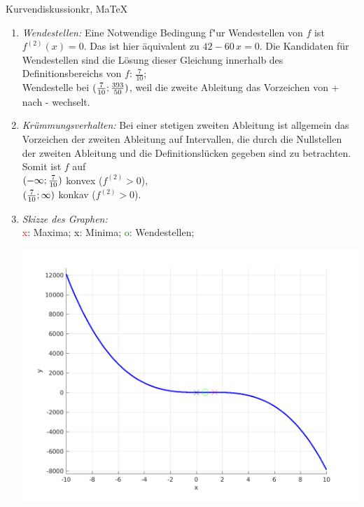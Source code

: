 \begin{MAufgabe}{Kurvendiskussion}{kr, MaTeX}
\begin{enumerate}
 $\MoIl-\infty\MIntvlSep0\MoIr$ monoton fallend, \\ 
 $\MoIl0\MIntvlSep\frac{7}{5}\MoIr$ monoton  wachsend, \\ 
 $\MoIl\frac{7}{5}\MIntvlSep \infty\MoIr$ monoton fallend. \\ 
 \item \emph{Wendestellen:} 
 Eine Notwendige Bedingung f"ur Wendestellen von $f$ ist $f^{(2)}(x)=0$. 
 Das ist hier \"aquivalent zu $42 - 60\, x=0$. 
 Die Kandidaten f\"ur Wendestellen sind die L\"osung dieser Gleichung innerhalb des Definitionsbereichs von $f$: $\frac{7}{10}$; \\ 
 Wendestelle bei $(\frac{7}{10};\frac{393}{50})$, weil die zweite Ableitung das Vorzeichen von + nach - wechselt. \\ 
 \item \emph{Kr\"ummungsverhalten:} 
 Bei einer stetigen zweiten Ableitung ist allgemein das Vorzeichen der zweiten Ableitung auf Intervallen, die durch die Nullstellen der zweiten Ableitung und die Definitionsl\"ucken gegeben sind zu betrachten. 
 Somit ist $f$ auf \\ 
 $(-\infty ;\frac{7}{10})$  konvex ($f^{(2)}>0$), \\ 
 $(\frac{7}{10}; \infty)$  konkav ($f^{(2)}>0$). \\ 
 \item \emph{Skizze des Graphen:} \\ 
 {\textcolor{red} x}: Maxima; {\textcolor{black} x}: Minima; {\textcolor{green} o}: Wendestellen; 
  \begin{center}
  \includegraphics[width=0.8\linewidth]{Abb_zur_Ag_autogenerated_fractions_28.png} \end{center}
  
 \end{enumerate}
 \else\relax\fi
  \end{MAufgabe}